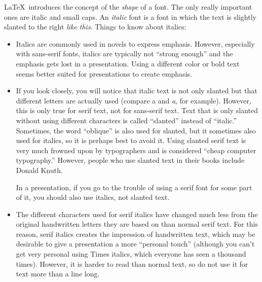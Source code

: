 \LaTeX\ introduces the concept of the \emph{shape} of a font. The only really important ones are italic and small caps. An \emph{italic} font is a font in which the text is slightly slanted to the right \emph{like this}. Things to know about italics:
\begin{itemize}
\item
  Italics are commonly used in novels to express emphasis. However, especially with sans-serif fonts, italics are typically not ``strong enough'' and the emphasis gets lost in a presentation. Using a different color or bold text seems better suited for presentations to create emphasis.
\item
  If you look closely, you will notice that italic text is not only slanted but that different letters are actually used (compare a and \emph{a}, for example). However, this is only true for serif text, not for sans-serif text. Text that is only slanted without using different characters is called ``slanted'' instead of ``italic.'' Sometimes, the word ``oblique'' is also used for slanted, but it sometimes also used for italics, so it is perhaps best to avoid it. Using slanted serif text is very much frowned upon by typographers and is considered ``cheap computer typography.'' However, people who use slanted text in their books include Donald Knuth.

  In a presentation, if you go to the trouble of using a serif font for some part of it, you should also use italics, not slanted text.
\item
  The different characters used for serif italics have changed much less from the original handwritten letters they are based on than normal serif text. For this reason, serif italics creates the impression of handwritten text, which may be desirable to give a presentation a more ``personal touch'' (although you can't get very personal using Times italics, which everyone has seen a thousand times). However, it is harder to read than normal text, so do not use it for text more than a line long.
\end{itemize}

